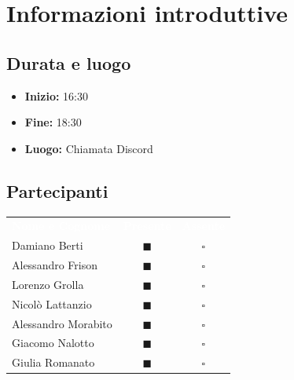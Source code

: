 \documentclass[a4paper, 11pt]{article}
\begin{document}

\section{Informazioni introduttive}

\subsection{Durata e luogo}
\begin{itemize}
    \item \textbf{Inizio:} 16:30
    \item \textbf{Fine:} 18:30
    \item \textbf{Luogo:} Chiamata Discord
\end{itemize}

\subsection{Partecipanti}
\begin{center}
    \begin{tabular}{>{\raggedright\arraybackslash}p{6cm} c c}
        \rowcolor{AccentColor}
        \textcolor{white}{\textbf{Nome e Cognome}} & 
        \textcolor{white}{\textbf{Presente}} & 
        \textcolor{white}{\textbf{Assente}} \\
        
        Damiano Berti     & \textcolor{AccentColor}{$\blacksquare$}    & $\square$        \\
        Alessandro Frison     & \textcolor{AccentColor}{$\blacksquare$}    & $\square$        \\
        Lorenzo Grolla     & \textcolor{AccentColor}{$\blacksquare$}    & $\square$        \\
        Nicolò Lattanzio    & \textcolor{AccentColor}{$\blacksquare$}    & $\square$        \\
        Alessandro Morabito   & \textcolor{AccentColor}{$\blacksquare$}    & $\square$        \\
        Giacomo Nalotto   & \textcolor{AccentColor}{$\blacksquare$}    & $\square$        \\
        Giulia Romanato   & \textcolor{AccentColor}{$\blacksquare$}    & $\square$        \\
    \end{tabular}
\end{center}
\end{document}
